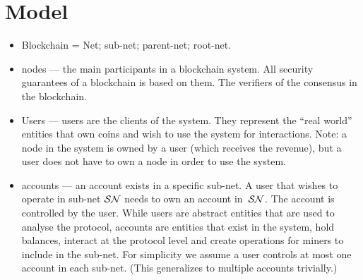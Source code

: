 \section{Model}
\label{sec:model}

\begin{itemize}
    \item Blockchain = Net; sub-net; parent-net; root-net.
    \item nodes --- the main participants in a blockchain system. All security guarantees of a blockchain is based on them. The verifiers of the consensus in the blockchain. 
    \item Users --- users are the clients of the system. They represent the ``real world'' entities that own coins and wish to use the system for interactions. Note: a node in the system is owned by a user (which receives the revenue), but a user does not have to own a node in order to use the system.
    \item accounts --- an account exists in a specific sub-net. A user that wishes to operate in sub-net $\mathcal{SN}$ needs to own an account in~$\mathcal{SN}$. The account is controlled by the user.
    While users are abstract entities that are used to analyse the protocol, accounts are entities that exist in the system, hold balances, interact at the protocol level and create operations for miners to include in the sub-net.
    For simplicity we assume a user controls at most one account in each sub-net. (This generalizes to multiple accounts trivially.)
\end{itemize}